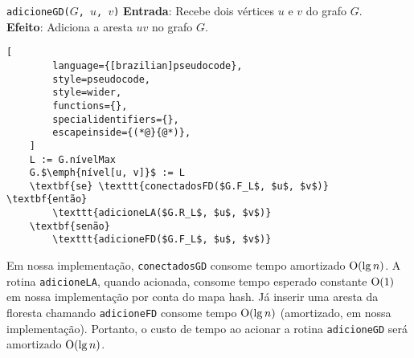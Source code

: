 \begin{programruledcaption}{\texttt{adicioneGD($G$, $u$, $v$)} \label{prog:addGD}}
    \noindent\textbf{Entrada}: Recebe dois vértices $u$ e $v$ do grafo $G$. \\
    \textbf{Efeito}: Adiciona a aresta $uv$ no grafo $G$.
    \vspace{-0.5\baselineskip}
    \begin{lstlisting}[
        language={[brazilian]pseudocode},
        style=pseudocode,
        style=wider,
        functions={},
        specialidentifiers={},
        escapeinside={(*@}{@*)},
    ]
    L := G.nívelMax
    G.$\emph{nível[u, v]}$ := L
    \textbf{se} \texttt{conectadosFD($G.F_L$, $u$, $v$)} \textbf{então}
        \texttt{adicioneLA($G.R_L$, $u$, $v$)}
    \textbf{senão}
        \texttt{adicioneFD($G.F_L$, $u$, $v$)}
    \end{lstlisting}
    \vspace{-0.5\baselineskip}
\end{programruledcaption}

\raggedbottom


Em nossa implementação, \texttt{conectadosGD} consome tempo amortizado $\mathrm{O}(\lg n)$. A rotina \texttt{adicioneLA}, quando acionada, consome tempo esperado constante $\mathrm{O}(1)$ em nossa implementação por conta do mapa hash. Já inserir uma aresta da floresta chamando \texttt{adicioneFD} consome tempo $\mathrm{O}(\lg n)$ (amortizado, em nossa implementação). Portanto, o custo de tempo ao acionar a rotina \texttt{adicioneGD} será amortizado $\mathrm{O}(\lg n)$.


